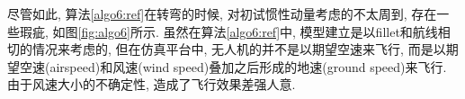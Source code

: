 \documentclass[UTF8,a4paper,10pt,nocolorlinks]{ctexart}
\begin{document}
    尽管如此, 算法\ref{algo6:ref}在转弯的时候, 对初试惯性动量考虑的不太周到, 存在一些瑕疵, 如图\ref{fig:algo6}所示.
    虽然在算法\ref{algo6:ref}中, 模型建立是以fillet和航线相切的情况来考虑的, 但在仿真平台中, 无人机的并不是以期望空速来飞行, 而是以期望空速(airspeed)和风速(wind speed)叠加之后形成的地速(ground speed)来飞行. 由于风速大小的不确定性, 造成了飞行效果差强人意.
    \begin{figure}[htbp]
        \centering
\end{figure}
\end{document}

